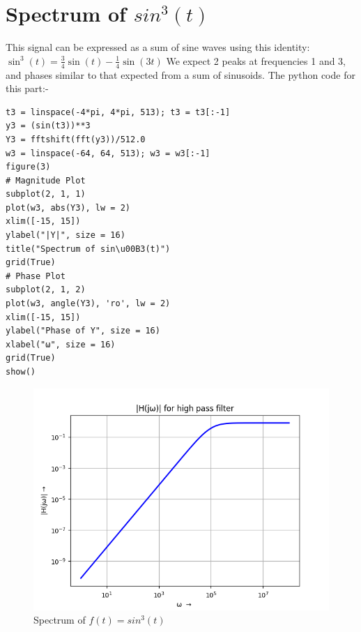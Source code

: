 \documentclass{article}
\begin{document}
\section{Spectrum of $sin^3(t)$}
This signal can be expressed as a sum of sine waves using this identity:\newline
$\sin^3(t) = \frac{3}{4}\sin(t) - \frac{1}{4}\sin(3t)$\newline
We expect 2 peaks at frequencies 1 and 3, and phases similar to that expected from a sum of sinusoids.
The python code for this part:-
\begin{lstlisting}
t3 = linspace(-4*pi, 4*pi, 513); t3 = t3[:-1]
y3 = (sin(t3))**3
Y3 = fftshift(fft(y3))/512.0
w3 = linspace(-64, 64, 513); w3 = w3[:-1]
figure(3)
# Magnitude Plot
subplot(2, 1, 1)
plot(w3, abs(Y3), lw = 2)
xlim([-15, 15])
ylabel("|Y|", size = 16)
title("Spectrum of sin\u00B3(t)")
grid(True)
# Phase Plot
subplot(2, 1, 2)
plot(w3, angle(Y3), 'ro', lw = 2)
xlim([-15, 15])
ylabel("Phase of Y", size = 16)
xlabel("ω", size = 16)
grid(True)
show()
\end{lstlisting}
\begin{figure}[h!]
\centering
\includegraphics[scale=0.6]{Figure_3.png}
\caption{Spectrum of $f(t) = sin^3(t)$}
\label{fig:universe}
\end{figure}
\end{document}
